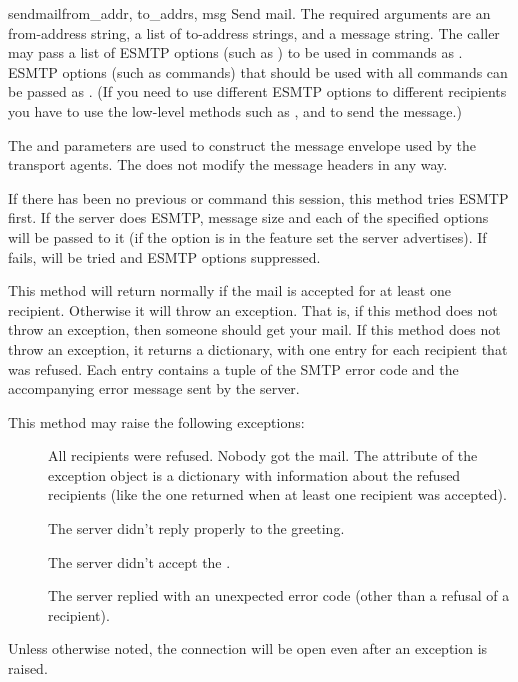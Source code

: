 \begin{methoddesc}{sendmail}{from_addr, to_addrs, msg}
Send mail.  The required arguments are an  from-address
string, a list of  to-address strings, and a message string.
The caller may pass a list of ESMTP options (such as )
to be used in  commands as .  ESMTP
options (such as  commands) that should be used with all
 commands can be passed as .  (If you
need to use different ESMTP options to different recipients you have
to use the low-level methods such as ,  and
 to send the message.)

  The  and  parameters are
used to construct the message envelope used by the transport agents.
The  does not modify the message headers in any way.

If there has been no previous  or  command this
session, this method tries ESMTP  first. If the server does
ESMTP, message size and each of the specified options will be passed
to it (if the option is in the feature set the server advertises).  If
 fails,  will be tried and ESMTP options
suppressed.

This method will return normally if the mail is accepted for at least
one recipient. Otherwise it will throw an exception.  That is, if this
method does not throw an exception, then someone should get your mail.
If this method does not throw an exception, it returns a dictionary,
with one entry for each recipient that was refused.  Each entry
contains a tuple of the SMTP error code and the accompanying error
message sent by the server.

This method may raise the following exceptions:

\begin{description}
\item[]
All recipients were refused.  Nobody got the mail.  The
 attribute of the exception object is a dictionary
with information about the refused recipients (like the one returned
when at least one recipient was accepted).

\item[]
The server didn't reply properly to the  greeting.

\item[]
The server didn't accept the .

\item[]
The server replied with an unexpected error code (other than a refusal
of a recipient).
\end{description}

Unless otherwise noted, the connection will be open even after
an exception is raised.

\end{methoddesc}


